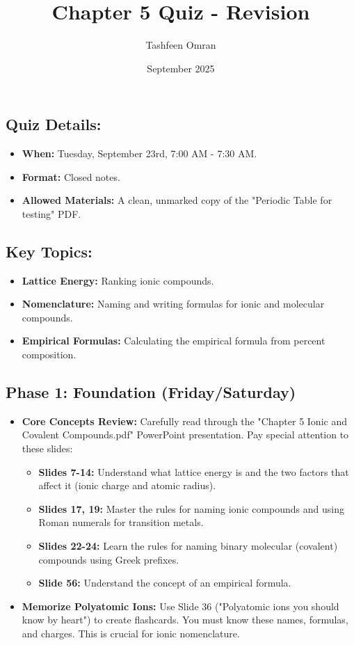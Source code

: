 \documentclass{article}
\title{Chapter 5 Quiz - Revision}
\author{Tashfeen Omran}
\date{September 2025}
\begin{document}
\maketitle
{} %


\hrulefill
\subsection*{Quiz Details:}
\begin{itemize}[itemsep=5pt]
    \item \textbf{When:} Tuesday, September 23rd, 7:00 AM - 7:30 AM.
    \item \textbf{Format:} Closed notes.
    \item \textbf{Allowed Materials:} A clean, unmarked copy of the "Periodic Table for testing" PDF.
\end{itemize}

\hrulefill
\subsection*{Key Topics:}
\begin{itemize}[itemsep=5pt]
    \item \textbf{Lattice Energy:} Ranking ionic compounds.
    \item \textbf{Nomenclature:} Naming and writing formulas for ionic and molecular compounds.
    \item \textbf{Empirical Formulas:} Calculating the empirical formula from percent composition.
\end{itemize}
\hrulefill
\bigskip
\subsection*{Phase 1: Foundation (Friday/Saturday)}
\begin{itemize}[itemsep=5pt]
    \item \textbf{Core Concepts Review:} Carefully read through the "Chapter 5 Ionic and Covalent Compounds.pdf" PowerPoint presentation. Pay special attention to these slides:
    \begin{itemize}
        \item \textbf{Slides 7-14:} Understand what lattice energy is and the two factors that affect it (ionic charge and atomic radius).
        \item \textbf{Slides 17, 19:} Master the rules for naming ionic compounds and using Roman numerals for transition metals.
        \item \textbf{Slides 22-24:} Learn the rules for naming binary molecular (covalent) compounds using Greek prefixes.
        \item \textbf{Slide 56:} Understand the concept of an empirical formula.
    \end{itemize}
    \item \textbf{Memorize Polyatomic Ions:} Use Slide 36 ("Polyatomic ions you should know by heart") to create flashcards. You must know these names, formulas, and charges. This is crucial for ionic nomenclature.
\end{itemize}
\end{document}
